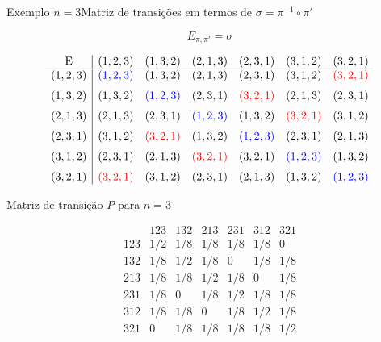 \documentclass{beamer}
\begin{document}
\begin{frame}{Exemplo $n=3$}{Matriz de transições em termos de $\sigma = \pi^{-1} \circ \pi'$}

 \[
    E_{\pi,\pi'} = \sigma
  \]

  \[
    \begin{array}{c|cccccc}
 $E$     & (1,2,3) & (1,3,2) & (2,1,3) & (2,3,1) & (3,1,2) & (3,2,1) \\ \hline
      (1,2,3) & \textcolor{blue}{(1,2,3)} & (1,3,2) & (2,1,3) & (2,3,1) & (3,1,2) & \textcolor{red}{(3,2,1)} \\[6pt]
      (1,3,2) & (1,3,2) & \textcolor{blue}{(1,2,3)} & (2,3,1) & \textcolor{red}{(3,2,1)} & (2,1,3) & (2,3,1) \\[6pt]
      (2,1,3) & (2,1,3) & (2,3,1) & \textcolor{blue}{(1,2,3)} & (1,3,2) & \textcolor{red}{(3,2,1)} & (3,1,2) \\[6pt]
      (2,3,1) & (3,1,2) &  \textcolor{red}{(3,2,1)} & (1,3,2) & \textcolor{blue}{(1,2,3)} & (2,3,1) & (2,1,3) \\[6pt]
      (3,1,2) & (2,3,1) & (2,1,3) & \textcolor{red}{(3,2,1)} & (3,2,1) & \textcolor{blue}{(1,2,3)} & (1,3,2) \\[6pt]
      (3,2,1) &  \textcolor{red}{(3,2,1)} & (3,1,2) & (2,3,1) & (2,1,3) & (1,3,2) & \textcolor{blue}{(1,2,3)}      
  \end{array}
\]


\end{frame}
\begin{frame}{Matriz de transição \(P\) para \(n=3\)}

  \[
\begin{array}{c|cccccc}
 & 123 & 132 & 213 & 231 & 312 & 321 \\ \hline 
123 & 1/2 & 1/8 & 1/8 & 1/8 & 1/8 & 0 \\[15pt]
132 & 1/8 & 1/2 & 1/8 & 0   & 1/8 & 1/8 \\[15pt]
213 & 1/8 & 1/8 & 1/2 & 1/8 & 0   & 1/8 \\[15pt]
231 & 1/8 & 0   & 1/8 & 1/2 & 1/8 & 1/8 \\[15pt]
312 & 1/8 & 1/8 & 0   & 1/8 & 1/2 & 1/8 \\[15pt]
321 & 0   & 1/8 & 1/8 & 1/8 & 1/8 & 1/2
\end{array}
\]

\end{frame}
\end{document}
